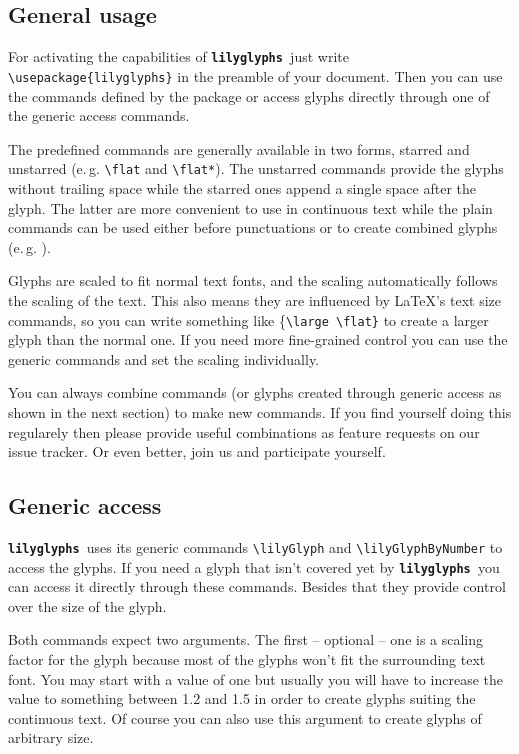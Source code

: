 \documentclass{article}
\newcommand{\lilyglyphs}{\texttt{\textbf{lilyglyphs }}}
\newcommand*{\cmd}[1]{\texttt{\textbackslash #1}}
\begin{document}
\subsection{General usage}
For activating the capabilities of \lilyglyphs just write \cmd{usepackage\{lilyglyphs\}} in the preamble of your document. Then you can use the commands defined by the package or access glyphs directly through one of the generic access commands.

The predefined commands are generally available in two forms, starred and unstarred (e.\,g. \cmd{flat} and \cmd{flat*}). The unstarred commands provide the glyphs without trailing space while the starred ones append a single space after the glyph. The latter are more convenient to use in continuous text while the plain commands can be used either before punctuations or to create combined glyphs (e.\,g. \lilyS\lilyF\lilyF\lilyZ).

Glyphs are scaled to fit normal text fonts, and the scaling automatically follows the scaling of the text. This also means they are influenced by \LaTeX 's text size commands, so you can write something like \{\cmd{large \textbackslash flat\}} to create a larger {\large \flat} glyph than the normal \flat* one. If you need more fine-grained control you can use the generic commands and set the scaling individually.

You can always combine commands (or glyphs created through generic access as shown in the next section) to make new commands. If you find yourself doing this regularely then please provide useful combinations as feature requests on our issue tracker. Or even better, join us and participate yourself.



\subsection{Generic access}
\lilyglyphs uses its generic commands \cmd{lilyGlyph} and \cmd{lilyGlyphByNumber} to access the glyphs. If you need a glyph that isn't covered yet by \lilyglyphs you can access it directly through these commands. Besides that they provide control over the size of the glyph.

Both commands expect two arguments. The first -- optional -- one is a scaling factor for the glyph because most of the glyphs won't fit the surrounding text font. You may start with a value of one but usually you will have to increase the value to something between 1.2 and 1.5 in order to create glyphs suiting the continuous text. Of course you can also use this argument to create glyphs of arbitrary size. 
\end{document}
